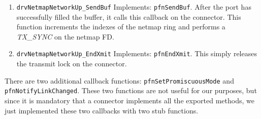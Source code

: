 \documentclass[a4paper, 12pt, titlepage]{report}
\begin{document}
\begin{enumerate}
\item \texttt{drvNetmapNetworkUp\_SendBuf} Implements: \texttt{pfnSendBuf}. After the port has successfully filled the buffer, it calls this callback on the connector. This function increments the indexes of the netmap ring and performs a \textit{TX\_SYNC} on the netmap FD.
\item \texttt{drvNetmapNetworkUp\_EndXmit} Implements: \texttt{pfnEndXmit}. This simply releases the transmit lock on the connector.
\end{enumerate}
There are two additional callback functions: \texttt{pfnSetPromiscuousMode} and \texttt{pfnNotifyLinkChanged}. These two functions are not useful for our purposes, but since it is mandatory that a connector implements all the exported methods, we just implemented these two callbacks with two stub functions.
\end{document}

